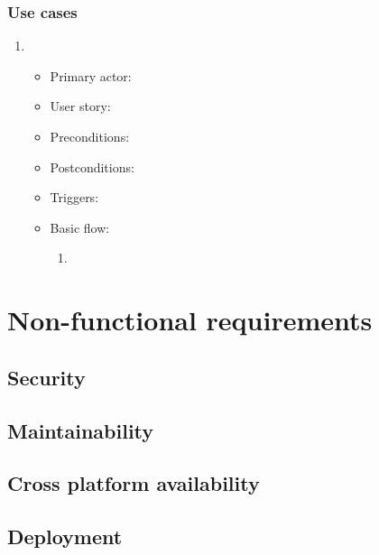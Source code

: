 \subsubsection{Use cases}
\begin{enumerate}
\item 
\begin{itemize}
    \item Primary actor:
    \item User story:
    \item Preconditions:
    \item Postconditions:
    \item Triggers:
    \item Basic flow:
        \begin{enumerate}
            \item 
        \end{enumerate}
\end{itemize}
\end{enumerate}


\section{Non-functional requirements}
\subsection{Security}
\subsection{Maintainability}
\subsection{Cross platform availability}
\subsection{Deployment}